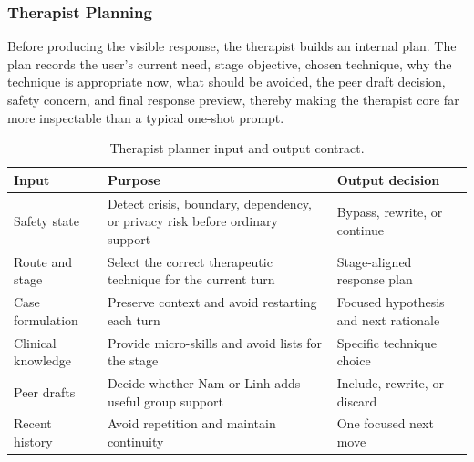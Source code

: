 \subsubsection{Therapist Planning}

Before producing the visible response, the therapist builds an internal plan. The plan records the user's current need, stage objective, chosen technique, why the technique is appropriate now, what should be avoided, the peer draft decision, safety concern, and final response preview, thereby making the therapist core far more inspectable than a typical one-shot prompt.

\begin{table}[tb]
\centering
\caption{Therapist planner input and output contract.}
\label{tab:therapist_planner_io}
\small
\begin{tabular}{p{}p{}p{}}
\toprule
Input & Purpose & Output decision \\
\midrule
Safety state & Detect crisis, boundary, dependency, or privacy risk before ordinary support & Bypass, rewrite, or continue \\
Route and stage & Select the correct therapeutic technique for the current turn & Stage-aligned response plan \\
Case formulation & Preserve context and avoid restarting each turn & Focused hypothesis and next rationale \\
Clinical knowledge & Provide micro-skills and avoid lists for the stage & Specific technique choice \\
Peer drafts & Decide whether Nam or Linh adds useful group support & Include, rewrite, or discard \\
Recent history & Avoid repetition and maintain continuity & One focused next move \\
\bottomrule
\end{tabular}
\end{table}

